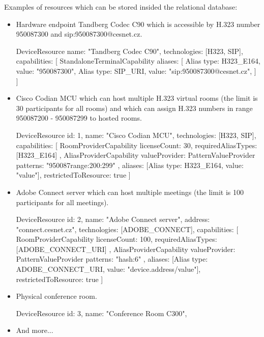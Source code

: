 Examples of resources which can be stored insided the relational database:

\begin{itemize}

\item Hardware endpoint Tandberg Codec C90 which is accessible by H.323 number 950087300 and sip:950087300@cesnet.cz.
\begin{Entity}
DeviceResource {
  name: "Tandberg Codec C90",
  technologies: [H323, SIP],
  capabilities: [
    StandaloneTerminalCapability {
      aliases: [
        Alias { type: H323_E164, value: "950087300"},
        Alias { type: SIP_URI,   value: "sip:950087300@cesnet.cz"},  	  	
      ]
    }
  ] 
}
\end{Entity}

\newpage
\item Cisco Codian MCU which can host multiple H.323 virtual rooms (the limit is 30 participants for all rooms) and which can assign H.323 numbers in range 950087200 - 950087299 to hosted rooms.
\begin{Entity}
DeviceResource {
  id: 1,
  name: "Cisco Codian MCU",
  technologies: [H323, SIP],
  capabilities: [
    RoomProviderCapability {
      licenseCount: 30,
      requiredAliasTypes: [H323_E164]
    },
    AliasProviderCapability {
      valueProvider: PatternValueProvider {
        patterns: "950087{range:200:299}"
      },
      aliases: [Alias { type: H323_E164, value: "{value}"}],
      restrictedToResource: true 
    }
  ]
}
\end{Entity}

\item Adobe Connect server which can host multiple meetings (the limit is 100 participants for all meetings).
\begin{Entity}
DeviceResource {
  id: 2,
  name: "Adobe Connect server",
  address: "connect.cesnet.cz",
  technologies: [ADOBE_CONNECT],
  capabilities: [
    RoomProviderCapability {
      licenseCount: 100,
      requiredAliasTypes: [ADOBE_CONNECT_URI]
    },
    AliasProviderCapability {
      valueProvider: PatternValueProvider {
        patterns: "{hash:6}"
      },
      aliases: [Alias { type: ADOBE_CONNECT_URI, value: "{device.address}/{value}"}],
      restrictedToResource: true 
    }
  ]
}
\end{Entity}

\item Physical conference room.

\begin{Entity}
DeviceResource {
  id: 3,
  name: "Conference Room C300",
}
\end{Entity}

\item And more...

\end{itemize}



